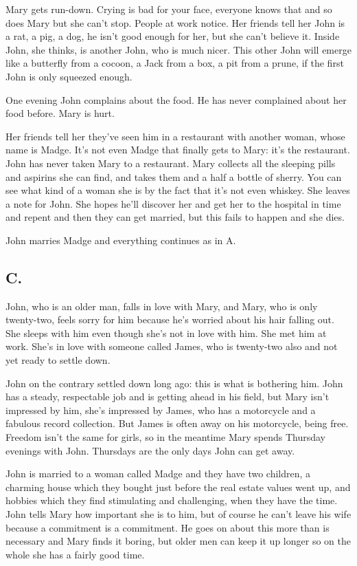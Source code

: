 \documentclass[10pt,a4paper]{article}
\begin{document}
Mary gets run-down. Crying is bad for your face, everyone knows that and so does Mary but she can't stop. People at work notice. Her friends tell her John is a rat, a pig, a dog, he isn't good enough for her, but she can't believe it. Inside John, she thinks, is another John, who is much nicer. This other John will emerge like a butterfly from a cocoon, a Jack from a box, a pit from a prune, if the first John is only squeezed enough.

One evening John complains about the food. He has never complained about her food before. Mary is hurt.

Her friends tell her they've seen him in a restaurant with another woman, whose name is Madge. It's not even Madge that finally gets to Mary: it's the restaurant. John has never taken Mary to a restaurant. Mary collects all the sleeping pills and aspirins she can find, and takes them and a half a bottle of sherry. You can see what kind of a woman she is by the fact that it's not even whiskey. She leaves a note for John. She hopes he'll discover her and get her to the hospital in time and repent and then they can get married, but this fails to happen and she dies.

John marries Madge and everything continues as in A.

\subsection{C.}
John, who is an older man, falls in love with Mary, and Mary, who is only twenty-two, feels sorry for him because he's worried about his hair falling out. She sleeps with him even though she's not in love with him. She met him at work. She's in love with someone called James, who is twenty-two also and not yet ready to settle down. 

John on the contrary settled down long ago: this is what is bothering him. John has a steady, respectable job and is getting ahead in his field, but Mary isn't impressed by him, she's impressed by James, who has a motorcycle and a fabulous record collection. But James is often away on his motorcycle, being free. Freedom isn't the same for girls, so in the meantime Mary spends Thursday evenings with John. Thursdays are the only days John can get away. 

John is married to a woman called Madge and they have two children, a charming house which they bought just before the real estate values went up, and hobbies which they find stimulating and challenging, when they have the time. John tells Mary how important she is to him, but of course he can't leave his wife because a commitment is a commitment. He goes on about this more than is necessary and Mary finds it boring, but older men can keep it up longer so on the whole she has a fairly good time. 
\end{document}
